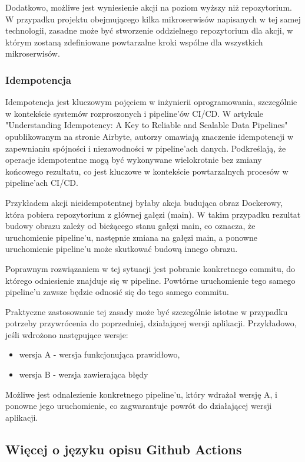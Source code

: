 \documentclass{article}
\begin{document}
Dodatkowo, możliwe jest wyniesienie akcji na poziom wyższy niż repozytorium. W przypadku projektu obejmującego kilka mikroserwisów napisanych w tej samej technologii, zasadne może być stworzenie oddzielnego repozytorium dla akcji, w którym zostaną zdefiniowane powtarzalne kroki wspólne dla wszystkich mikroserwisów.

\subsubsection{Idempotencja}

Idempotencja jest kluczowym pojęciem w inżynierii oprogramowania, szczególnie w kontekście systemów rozproszonych i pipeline'ów CI/CD. W artykule "Understanding Idempotency: A Key to Reliable and Scalable Data Pipelines" \cite{understandingIdempotency} opublikowanym na stronie Airbyte, autorzy omawiają znaczenie idempotencji w zapewnianiu spójności i niezawodności w pipeline'ach danych. Podkreślają, że operacje idempotentne mogą być wykonywane wielokrotnie bez zmiany końcowego rezultatu, co jest kluczowe w kontekście powtarzalnych procesów w pipeline'ach CI/CD.

Przykładem akcji nieidempotentnej byłaby akcja budująca obraz Dockerowy, która pobiera repozytorium z głównej gałęzi (main). W takim przypadku rezultat budowy obrazu zależy od bieżącego stanu gałęzi main, co oznacza, że uruchomienie pipeline’u, następnie zmiana na gałęzi main, a ponowne uruchomienie pipeline’u może skutkować budową innego obrazu.

Poprawnym rozwiązaniem w tej sytuacji jest pobranie konkretnego commitu, do którego odniesienie znajduje się w pipeline. Powtórne uruchomienie tego samego pipeline’u zawsze będzie odnosić się do tego samego commitu.

Praktyczne zastosowanie tej zasady może być szczególnie istotne w przypadku potrzeby przywrócenia do poprzedniej, działającej wersji aplikacji. Przykładowo, jeśli wdrożono następujące wersje:
\begin{itemize}
    \item wersja A - wersja funkcjonująca prawidłowo,
    \item wersja B - wersja zawierająca błędy
\end{itemize}

Możliwe jest odnalezienie konkretnego pipeline’u, który wdrażał wersję A, i ponowne jego uruchomienie, co zagwarantuje powrót do działającej wersji aplikacji.

\subsection{Więcej o języku opisu Github Actions}
\end{document}
